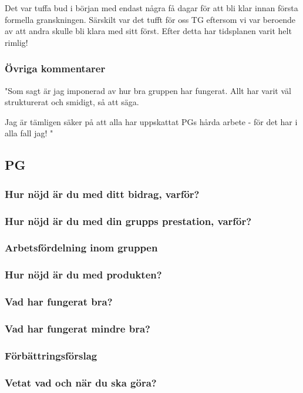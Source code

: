 \documentclass[a4paper]{article}
\begin{document}
Det var tuffa bud i början med endast några få dagar för att bli klar innan första formella granskningen. Särskilt var det tufft för oss TG eftersom vi var beroende av att andra skulle bli klara med sitt först. Efter detta har tidsplanen varit helt rimlig!

\subsubsection{Övriga kommentarer}

"Som sagt är jag imponerad av hur bra gruppen har fungerat. Allt har varit väl strukturerat och smidigt, så att säga. 

Jag är tämligen säker på att alla har uppskattat PGs hårda arbete - för det har i alla fall jag! "


\subsection{PG}
\subsubsection{Hur nöjd är du med ditt bidrag, varför?}
\subsubsection{Hur nöjd är du med din grupps prestation, varför?}
\subsubsection{Arbetsfördelning inom gruppen}
\subsubsection{Hur nöjd är du med produkten?}
\subsubsection{Vad har fungerat bra?}
\subsubsection{Vad har fungerat mindre bra?}
\subsubsection{Förbättringsförslag}
\subsubsection{Vetat vad och när du ska göra?}
\end{document}

